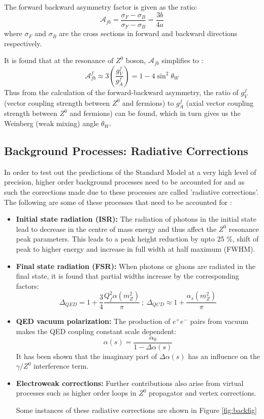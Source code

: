 The forward backward asymmetry factor is given as the ratio:
\begin{equation}
\mathcal{A}_{fb}=\dfrac{\sigma_{F}-\sigma_{B}}{\sigma_{F}-\sigma_{B}}=\dfrac{3b}{4a}
\end{equation}
where $\sigma_{F}$ and $\sigma_{B}$ are the cross sections in forward and backward directions respectively.

It is found that at the resonance of $Z^{0}$ boson, $\mathcal{A}_{fb}$ simplifies to \cite{UB}:
\begin{equation}
\mathcal{A}_{fb}^{f}\approx 3\left(\dfrac{g_{V}^{f}}{g_{A}^{f}}\right)=1-4\sin^{2}\theta_{W} 
\end{equation}
Thus from the calculation of the forward-backward asymmetry, the ratio of $g_{V}^{f}$ (vector coupling strength between $Z^{0}$ and fermions) to $g_{A}^{f}$ (axial vector coupling strength between $Z^{0}$ and fermions) can be found, which in turn gives us the Weinberg (weak mixing) angle $\theta_{W}$.
\subsection{Background Processes: Radiative Corrections}
In order to test out the predictions of the Standard Model at a very high level of precision, higher order background processes need to be accounted for and as such the corrections made due to these processes are called 'radiative corrections'. The following are some of these processes that need to be accounted for \cite{Zedometry}:
\begin{itemize}
\item \textbf{Initial state radiation (ISR):} The radiation of photons in the initial state lead to decrease in the centre of mass energy and thus affect the $Z^{0}$ resonance peak parameters. This leads to a peak height reduction by upto 25 \%, shift of peak to higher energy and increase in full width at half maximum (FWHM). 
\item \textbf{Final state radiation (FSR):} When photons or gluons are radiated in the final state, it is found that partial widths increase by the corresponding factors:
\begin{equation}
\Delta_{QED}=1+\dfrac{3}{4}\dfrac{Q_{f}^{2}\alpha(m_{Z}^{2})}{\pi}\ ;\ \Delta_{QCD}\approx 1+\dfrac{\alpha_{s}(m_{Z}^{2})}{\pi}
\end{equation}
\item \textbf{QED vacuum polarization:} The production of $e^{+}e^{-}$ pairs from vacuum makes the QED coupling constant scale dependent: 
\begin{equation}
\alpha(s)=\dfrac{\alpha_{0}}{1-\Delta \alpha(s)}
\end{equation}
It has been shown that the imaginary part of $\Delta \alpha(s)$ has an influence on the $\gamma / Z^{0}$ interference term.
\item \textbf{Electroweak corrections:} Further contributions also arise from virtual processes such as higher order loops in $Z^{0}$ propagator and vertex corrections.

Some instances of these radiative corrections are shown in Figure \ref{fig:backfig}
\end{itemize}

